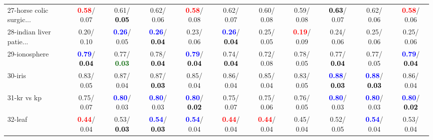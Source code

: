 \begin{table}[h]
\begin{center}
{\begin{tabular}{lc|c|c|c|c|c|c|c|c|c}
27-horse colic surgic... & \textcolor{red}{\textbf{  0.58}}/  0.07 &   0.61/\textcolor{black}{\textbf{  0.05}} &   0.62/  0.06 & \textcolor{red}{\textbf{  0.58}}/  0.08 &   0.62/  0.07 &   0.60/  0.08 &   0.59/  0.08 & \textcolor{black}{\textbf{  0.63}}/  0.07 &   0.62/  0.06 & \textcolor{red}{\textbf{  0.58}}/  0.06 \\
28-indian liver patie... &   0.20/  0.10 & \textcolor{blue}{\textbf{  0.26}}/  0.05 & \textcolor{blue}{\textbf{  0.26}}/\textcolor{black}{\textbf{  0.04}} &   0.23/  0.06 & \textcolor{blue}{\textbf{  0.26}}/\textcolor{black}{\textbf{  0.04}} &   0.25/  0.05 & \textcolor{red}{\textbf{  0.19}}/  0.09 &   0.24/  0.06 &   0.25/  0.06 &   0.25/  0.06 \\ \hline
29-ionosphere & \textcolor{blue}{\textbf{  0.79}}/\textcolor{black}{\textbf{  0.04}} &   0.77/\textcolor{darkgreen}{\textbf{  0.03}} &   0.78/\textcolor{black}{\textbf{  0.04}} & \textcolor{blue}{\textbf{  0.79}}/\textcolor{black}{\textbf{  0.04}} &   0.74/\textcolor{black}{\textbf{  0.04}} &   0.72/  0.08 &   0.78/  0.05 &   0.77/\textcolor{black}{\textbf{  0.04}} &   0.77/  0.05 & \textcolor{blue}{\textbf{  0.79}}/\textcolor{black}{\textbf{  0.04}} \\
30-iris &   0.83/  0.05 &   0.87/  0.04 &   0.87/\textcolor{black}{\textbf{  0.03}} &   0.85/  0.04 &   0.86/  0.04 &   0.85/  0.04 &   0.83/  0.05 & \textcolor{blue}{\textbf{  0.88}}/\textcolor{black}{\textbf{  0.03}} & \textcolor{blue}{\textbf{  0.88}}/\textcolor{black}{\textbf{  0.03}} &   0.86/  0.04 \\
31-kr vs kp &   0.75/  0.07 & \textcolor{blue}{\textbf{  0.80}}/  0.03 & \textcolor{blue}{\textbf{  0.80}}/  0.03 & \textcolor{blue}{\textbf{  0.80}}/\textcolor{black}{\textbf{  0.02}} &   0.75/  0.07 &   0.75/  0.06 &   0.76/  0.05 & \textcolor{blue}{\textbf{  0.80}}/  0.03 & \textcolor{blue}{\textbf{  0.80}}/  0.03 & \textcolor{blue}{\textbf{  0.80}}/\textcolor{black}{\textbf{  0.02}} \\
32-leaf & \textcolor{red}{\textbf{  0.44}}/  0.04 &   0.53/\textcolor{black}{\textbf{  0.03}} & \textcolor{blue}{\textbf{  0.54}}/\textcolor{black}{\textbf{  0.03}} & \textcolor{blue}{\textbf{  0.54}}/  0.04 & \textcolor{red}{\textbf{  0.44}}/  0.04 & \textcolor{red}{\textbf{  0.44}}/  0.04 &   0.45/  0.04 &   0.52/  0.05 & \textcolor{blue}{\textbf{  0.54}}/  0.04 &   0.53/  0.04 \\\end{tabular}}\label{stratsALCKappa0bestb}
\end{center}
\end{table}
